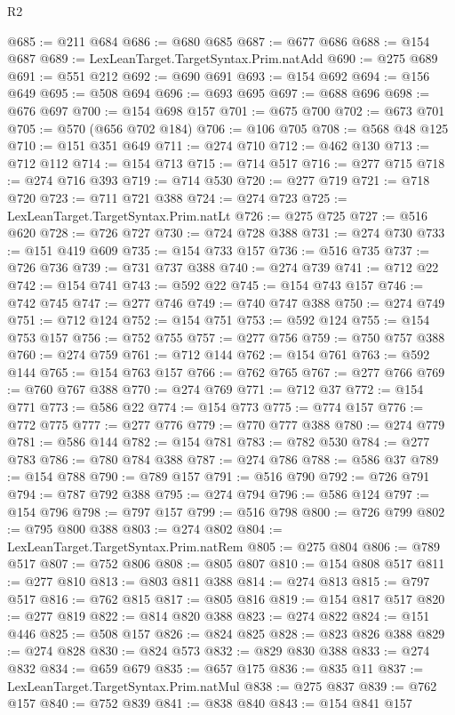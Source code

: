 \begin{lexlean}{R2}
\begin{coremodule}
@685 := @211 @684
@686 := @680 @685
@687 := @677 @686
@688 := @154 @687
@689 := LexLeanTarget.TargetSyntax.Prim.natAdd
@690 := @275 @689
@691 := @551 @212
@692 := @690 @691
@693 := @154 @692
@694 := @156 @649
@695 := @508 @694
@696 := @693 @695
@697 := @688 @696
@698 := @676 @697
@700 := @154 @698 @157
@701 := @675 @700
@702 := @673 @701
@705 := @570 (@656 @702 @184)
@706 := @106 @705
@708 := @568 @48 @125
@710 := @151 @351 @649
@711 := @274 @710
@712 := @462 @130
@713 := @712 @112
@714 := @154 @713
@715 := @714 @517
@716 := @277 @715
@718 := @274 @716 @393
@719 := @714 @530
@720 := @277 @719
@721 := @718 @720
@723 := @711 @721 @388
@724 := @274 @723
@725 := LexLeanTarget.TargetSyntax.Prim.natLt
@726 := @275 @725
@727 := @516 @620
@728 := @726 @727
@730 := @724 @728 @388
@731 := @274 @730
@733 := @151 @419 @609
@735 := @154 @733 @157
@736 := @516 @735
@737 := @726 @736
@739 := @731 @737 @388
@740 := @274 @739
@741 := @712 @22
@742 := @154 @741
@743 := @592 @22
@745 := @154 @743 @157
@746 := @742 @745
@747 := @277 @746
@749 := @740 @747 @388
@750 := @274 @749
@751 := @712 @124
@752 := @154 @751
@753 := @592 @124
@755 := @154 @753 @157
@756 := @752 @755
@757 := @277 @756
@759 := @750 @757 @388
@760 := @274 @759
@761 := @712 @144
@762 := @154 @761
@763 := @592 @144
@765 := @154 @763 @157
@766 := @762 @765
@767 := @277 @766
@769 := @760 @767 @388
@770 := @274 @769
@771 := @712 @37
@772 := @154 @771
@773 := @586 @22
@774 := @154 @773
@775 := @774 @157
@776 := @772 @775
@777 := @277 @776
@779 := @770 @777 @388
@780 := @274 @779
@781 := @586 @144
@782 := @154 @781
@783 := @782 @530
@784 := @277 @783
@786 := @780 @784 @388
@787 := @274 @786
@788 := @586 @37
@789 := @154 @788
@790 := @789 @157
@791 := @516 @790
@792 := @726 @791
@794 := @787 @792 @388
@795 := @274 @794
@796 := @586 @124
@797 := @154 @796
@798 := @797 @157
@799 := @516 @798
@800 := @726 @799
@802 := @795 @800 @388
@803 := @274 @802
@804 := LexLeanTarget.TargetSyntax.Prim.natRem
@805 := @275 @804
@806 := @789 @517
@807 := @752 @806
@808 := @805 @807
@810 := @154 @808 @517
@811 := @277 @810
@813 := @803 @811 @388
@814 := @274 @813
@815 := @797 @517
@816 := @762 @815
@817 := @805 @816
@819 := @154 @817 @517
@820 := @277 @819
@822 := @814 @820 @388
@823 := @274 @822
@824 := @151 @446
@825 := @508 @157
@826 := @824 @825
@828 := @823 @826 @388
@829 := @274 @828
@830 := @824 @573
@832 := @829 @830 @388
@833 := @274 @832
@834 := @659 @679
@835 := @657 @175
@836 := @835 @11
@837 := LexLeanTarget.TargetSyntax.Prim.natMul
@838 := @275 @837
@839 := @762 @157
@840 := @752 @839
@841 := @838 @840
@843 := @154 @841 @157

\end{coremodule}
\end{lexlean}
